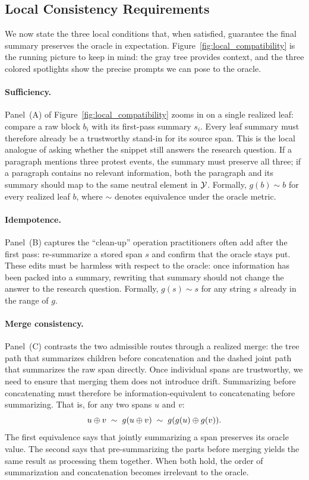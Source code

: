 \subsection{Local Consistency Requirements}

We now state the three local conditions that, when satisfied, guarantee the final summary preserves the oracle in expectation. Figure~\ref{fig:local_compatibility} is the running picture to keep in mind: the gray tree provides context, and the three colored spotlights show the precise prompts we can pose to the oracle.

\paragraph{Sufficiency.} Panel~(A) of Figure~\ref{fig:local_compatibility} zooms in on a single realized leaf: compare a raw block $b_i$ with its first-pass summary $s_i$. Every leaf summary must therefore already be a trustworthy stand-in for its source span. This is the local analogue of asking whether the snippet still answers the research question. If a paragraph mentions three protest events, the summary must preserve all three; if a paragraph contains no relevant information, both the paragraph and its summary should map to the same neutral element in $\mathcal{Y}$. Formally, $g(b) \sim b$ for every realized leaf $b$, where $\sim$ denotes equivalence under the oracle metric.

\paragraph{Idempotence.} Panel~(B) captures the ``clean-up'' operation practitioners often add after the first pass: re-summarize a stored span $s$ and confirm that the oracle stays put. These edits must be harmless with respect to the oracle: once information has been packed into a summary, rewriting that summary should not change the answer to the research question. Formally, $g(s) \sim s$ for any string $s$ already in the range of $g$.

\paragraph{Merge consistency.} Panel~(C) contrasts the two admissible routes through a realized merge: the tree path that summarizes children before concatenation and the dashed joint path that summarizes the raw span directly. Once individual spans are trustworthy, we need to ensure that merging them does not introduce drift. Summarizing before concatenating must therefore be information-equivalent to concatenating before summarizing. That is, for any two spans $u$ and $v$:
\[
u \oplus v \;\sim\; g(u \oplus v) \;\sim\; g(g(u) \oplus g(v)).
\]
The first equivalence says that jointly summarizing a span preserves its oracle value. The second says that pre-summarizing the parts before merging yields the same result as processing them together. When both hold, the order of summarization and concatenation becomes irrelevant to the oracle.

